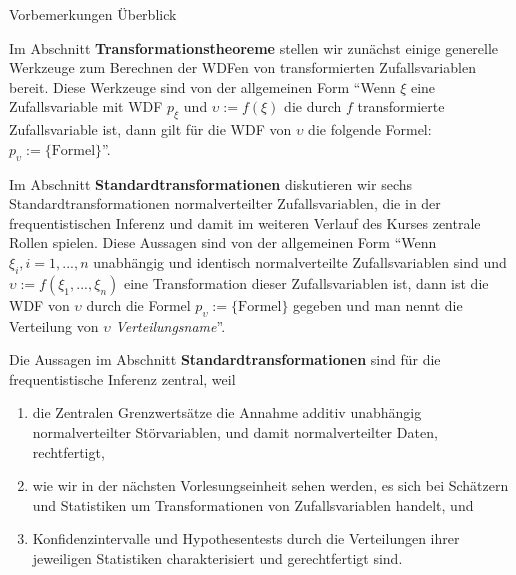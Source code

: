 \documentclass[
  8pt,
  ignorenonframetext,
]{beamer}
\providecommand{\tightlist}{%
  \setlength{\itemsep}{0pt}\setlength{\parskip}{0pt}}
\newcommand{\ups}{\upsilon}
\begin{document}
\begin{frame}{Vorbemerkungen}
\protect\hypertarget{vorbemerkungen-7}{}
Überblick

\footnotesize
\justifying

Im Abschnitt \textbf{Transformationstheoreme} stellen wir zunächst
einige generelle Werkzeuge zum Berechnen der WDFen von transformierten
Zufallsvariablen bereit. Diese Werkzeuge sind von der allgemeinen Form
``Wenn \(\xi\) eine Zufallsvariable mit WDF \(p_\xi\) und
\(\ups := f(\xi)\) die durch \(f\) transformierte Zufallsvariable ist,
dann gilt für die WDF von \(\ups\) die folgende Formel:
\(p_\ups := \{\mbox{Formel}\}\)''.

Im Abschnitt \textbf{Standardtransformationen} diskutieren wir sechs
Standardtransformationen normalverteilter Zufallsvariablen, die in der
frequentistischen Inferenz und damit im weiteren Verlauf des Kurses
zentrale Rollen spielen. Diese Aussagen sind von der allgemeinen Form
``Wenn \(\xi_i, i = 1,...,n\) unabhängig und identisch normalverteilte
Zufallsvariablen sind und \(\ups := f(\xi_1,...,\xi_n)\) eine
Transformation dieser Zufallsvariablen ist, dann ist die WDF von
\(\ups\) durch die Formel \(p_\ups := \{\mbox{Formel}\}\) gegeben und
man nennt die Verteilung von \(\ups\) \emph{Verteilungsname}''.

Die Aussagen im Abschnitt \textbf{Standardtransformationen} sind für die
frequentistische Inferenz zentral, weil

\begin{enumerate}
[(1)]
\tightlist
\item
  \justifying die Zentralen Grenzwertsätze die Annahme additiv
  unabhängig normalverteilter Störvariablen, und damit normalverteilter
  Daten, rechtfertigt,
\item
  wie wir in der nächsten Vorlesungseinheit sehen werden, es sich bei
  Schätzern und Statistiken um Transformationen von Zufallsvariablen
  handelt, und
\item
  Konfidenzintervalle und Hypothesentests durch die Verteilungen ihrer
  jeweiligen Statistiken charakterisiert und gerechtfertigt sind.
\end{enumerate}
\end{frame}
\end{document}
